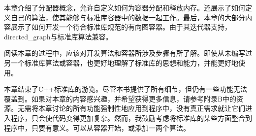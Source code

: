本章介绍了分配器概念，允许自定义如何为容器分配和释放内存。还展示了如何定义自己的算法，使其能够与标准库容器中的数据一起工作。最后，本章的大部分内容展示了如何开发一个符合标准库规范的有向图容器。由于其迭代器支持，directed\_graph与标准库算法兼容。

阅读本章的过程中，应该对开发算法和容器所涉及步骤有所了解。即使从未编写过另一个标准库算法或容器，也更好地理解了标准库的思想和能力，并能更好地使用。

本章结束了C++标准库的游览。尽管本书提供了所有细节，但仍有一些功能无法覆盖到。如果对本章的内容感兴趣，并希望获得更多信息，请参考附录B中的资源。无需将本章讨论的所有功能强制性地应用到程序中，没有真正需求就让它们进入程序，只会使代码变得更加复杂。然而，我鼓励考虑将标准库的某些方面整合到程序中，只要有意义。可以从容器开始，或添加一两个算法。
